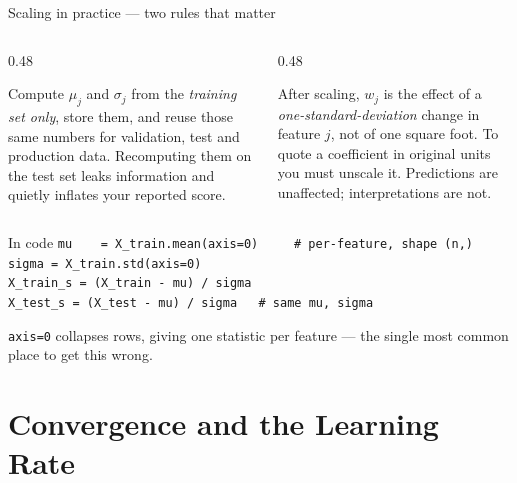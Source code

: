 \documentclass[aspectratio=169,10pt]{beamer}
\begin{document}
\begin{frame}{Scaling in practice --- two rules that matter}
  \footnotesize
  \begin{columns}[T,onlytextwidth]
    \begin{column}{0.48\textwidth}
      \begin{pitfall}
        Compute $\mu_j$ and $\sigma_j$ from the \emph{training set only}, store them, and
        reuse those same numbers for validation, test and production data. Recomputing them
        on the test set leaks information and quietly inflates your reported score.
      \end{pitfall}
    \end{column}
    \begin{column}{0.48\textwidth}
      \begin{pitfall}
        After scaling, $w_j$ is the effect of a \emph{one-standard-deviation} change in
        feature $j$, not of one square foot. To quote a coefficient in original units you
        must unscale it. Predictions are unaffected; interpretations are not.
      \end{pitfall}
    \end{column}
  \end{columns}
  \vspace{1mm}
  \begin{block}{In code}
    \texttt{mu\ \ \ \ = X\_train.mean(axis=0)\ \ \ \ \ \# per-feature, shape (n,)}\\
    \texttt{sigma\ = X\_train.std(axis=0)}\\
    \texttt{X\_train\_s = (X\_train - mu) / sigma}\\
    \texttt{X\_test\_s\ = (X\_test\ - mu) / sigma\ \ \ \# same mu, sigma}
  \end{block}
  \small
  \texttt{axis=0} collapses rows, giving one statistic per feature --- the single most common
  place to get this wrong.
\end{frame}

\section{Convergence and the Learning Rate}
\end{document}
